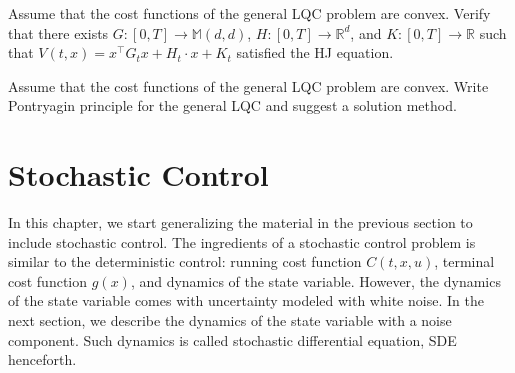 \documentclass[11pt]{book}
\begin{document}
\begin{ex}
Assume that the cost functions of the general LQC problem are convex.
    Verify that there exists $G:[0,T]\to \mathbb{M}(d,d)$, $H:[0,T]\to \mathbb{R}^d$, and $K:[0,T]\to \mathbb{R}$ such that 
    $V(t,x) = x^\top G_t x + H_t\cdot x + K_t$ satisfied the HJ equation.
\end{ex}


\begin{ex}
Assume that the cost functions of the general LQC problem are convex.
    Write Pontryagin principle for the general LQC and suggest a solution method. 
\end{ex}
\chapter{Stochastic Control}
In this chapter, we start generalizing the material in the previous section to include stochastic control. The ingredients of a stochastic control problem is similar to the deterministic control: running cost function $C(t,x,u)$, terminal cost function $g(x)$, and dynamics of the state variable. However, the dynamics of the state variable comes with uncertainty modeled with white noise. 
In the next section, we describe the dynamics of the state variable with a noise component. Such dynamics is called stochastic differential equation, SDE henceforth.
\end{document}

